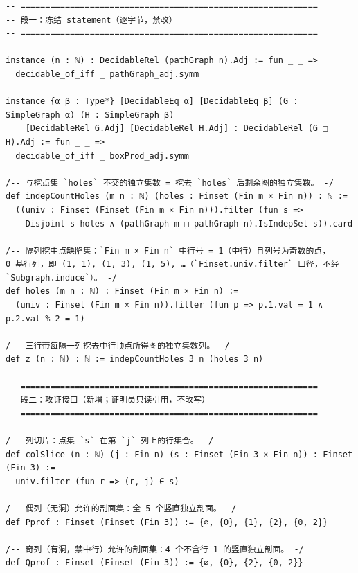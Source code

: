 \documentclass[11pt]{article}
\begin{document}
\begin{lstlisting}[caption={Frozen attack interface and matrix certificates,
verbatim lines 18--163 of \texttt{formalized/interface.lean} (sha256
\texttt{66c96c3e}): the frozen statement segment, the profile/transfer
definitions \texttt{P5}/\texttt{Q4}/\texttt{allowed}/\texttt{ValidProf}/%
\texttt{validCount}, the matrices \texttt{Amat}/\texttt{Bmat}/\texttt{Tmat}%
\ and the two \texttt{decide}-closed certificates
\texttt{cert\_ones}/\texttt{cert\_vec0}.},label={lst:s2}]
-- ============================================================
-- 段一：冻结 statement（逐字节，禁改）
-- ============================================================

instance (n : ℕ) : DecidableRel (pathGraph n).Adj := fun _ _ =>
  decidable_of_iff _ pathGraph_adj.symm

instance {α β : Type*} [DecidableEq α] [DecidableEq β] (G : SimpleGraph α) (H : SimpleGraph β)
    [DecidableRel G.Adj] [DecidableRel H.Adj] : DecidableRel (G □ H).Adj := fun _ _ =>
  decidable_of_iff _ boxProd_adj.symm

/-- 与挖点集 `holes` 不交的独立集数 = 挖去 `holes` 后剩余图的独立集数。 -/
def indepCountHoles (m n : ℕ) (holes : Finset (Fin m × Fin n)) : ℕ :=
  ((univ : Finset (Finset (Fin m × Fin n))).filter (fun s =>
    Disjoint s holes ∧ (pathGraph m □ pathGraph n).IsIndepSet s)).card

/-- 隔列挖中点缺陷集：`Fin m × Fin n` 中行号 = 1（中行）且列号为奇数的点，
0 基行列，即 (1, 1), (1, 3), (1, 5), …（`Finset.univ.filter` 口径，不经 `Subgraph.induce`）。 -/
def holes (m n : ℕ) : Finset (Fin m × Fin n) :=
  (univ : Finset (Fin m × Fin n)).filter (fun p => p.1.val = 1 ∧ p.2.val % 2 = 1)

/-- 三行带每隔一列挖去中行顶点所得图的独立集数列。 -/
def z (n : ℕ) : ℕ := indepCountHoles 3 n (holes 3 n)

-- ============================================================
-- 段二：攻证接口（新增；证明员只读引用，不改写）
-- ============================================================

/-- 列切片：点集 `s` 在第 `j` 列上的行集合。 -/
def colSlice (n : ℕ) (j : Fin n) (s : Finset (Fin 3 × Fin n)) : Finset (Fin 3) :=
  univ.filter (fun r => (r, j) ∈ s)

/-- 偶列（无洞）允许的剖面集：全 5 个竖直独立剖面。 -/
def Pprof : Finset (Finset (Fin 3)) := {∅, {0}, {1}, {2}, {0, 2}}

/-- 奇列（有洞，禁中行）允许的剖面集：4 个不含行 1 的竖直独立剖面。 -/
def Qprof : Finset (Finset (Fin 3)) := {∅, {0}, {2}, {0, 2}}


\end{lstlisting}
\end{document}
